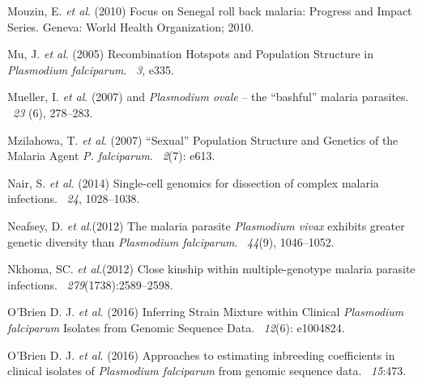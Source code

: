 \documentclass[9pt,lineno]{elife}
\begin{document}
\begin{thebibliography}{}
Mouzin, E. {\em et al}. (2010)
\newblock Focus on Senegal roll back malaria: Progress and Impact Series.
\newblock Geneva: World Health Organization; 2010.

Mu, J. {\em et al}. (2005)
\newblock Recombination Hotspots and Population Structure in {\it Plasmodium falciparum}.
~{\em 3}, e335.

Mueller, I. {\em et al}. (2007)
 and {\it Plasmodium ovale} -- the ``bashful'' malaria parasites.
~{\em 23\/} (6), 278--283.



Mzilahowa, T. {\em et al}. (2007)
\newblock “Sexual” Population Structure and Genetics of the Malaria Agent {\em P. falciparum}.
~{\em 2}(7): e613.

Nair, S. {\em et al}. (2014)
\newblock Single-cell genomics for dissection of complex malaria infections.
~{\em 24}, 1028--1038.

Neafsey, D. {\em et al}.(2012)
\newblock The malaria parasite {\it Plasmodium vivax} exhibits greater genetic diversity than {\it Plasmodium falciparum}.
~{\em 44\/}(9), 1046--1052.

Nkhoma, SC. {\em et al}.(2012)
\newblock Close kinship within multiple-genotype malaria parasite infections.
~{\em 279}(1738):2589--2598.

O'Brien D. J. {\em et al}. (2016)
\newblock Inferring Strain Mixture within Clinical {\em Plasmodium falciparum} Isolates from Genomic Sequence Data.
~{\em 12\/}(6): e1004824.

O'Brien D. J. {\em et al}. (2016)
\newblock Approaches to estimating inbreeding coefficients in clinical isolates of {\it Plasmodium falciparum} from genomic sequence data.
~{\em 15}:473.


\end{thebibliography}
\end{document}
